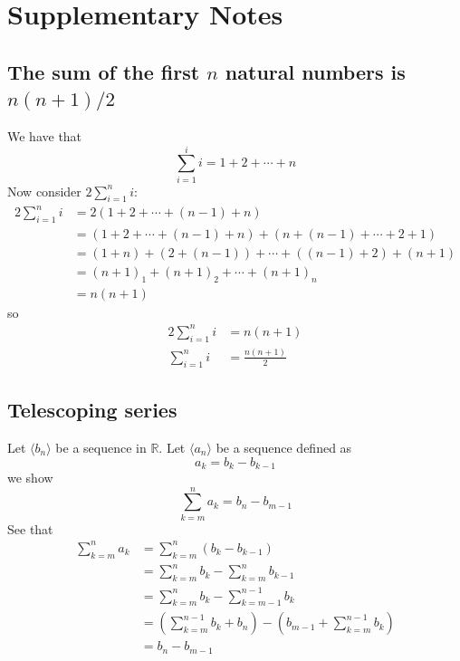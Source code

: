\documentclass{report}
\begin{document}
\subsection{}








\newpage

\chapter{Supplementary Notes}

\section{The sum of the first $n$ natural numbers is $n(n+1)/2$}
\label{supnotes:1}
We have that
\begin{equation*}
\sum^i_{i=1}i=1+2+\cdots+n
\end{equation*}
Now consider $2\sum^n_{i=1}i$:
\begin{align*}
2\sum^n_{i=1}i&=2(1+2+\cdots+(n-1)+n)\\
&=(1+2+\cdots+(n-1)+n)+(n+(n-1)+\cdots+2+1)\\
&=(1+n)+(2+(n-1))+\cdots+((n-1)+2)+(n+1)\\
&=(n+1)_1+(n+1)_2+\cdots+(n+1)_n\\
&=n(n+1)
\end{align*}
so
\begin{align*}
2\sum^n_{i=1}i&=n(n+1)\\
\sum^n_{i=1}i&=\frac{n(n+1)}{2}
\end{align*}
\newpage

\section{Telescoping series}
\label{supnotes:2}
Let $\langle b_n\rangle$ be a sequence in $\mathbb{R}$. Let $\langle a_n\rangle$ be a sequence defined as
\begin{equation*}
a_k=b_k-b_{k-1}
\end{equation*}
we show
\begin{equation*}
\boxed{\sum^n_{k=m}a_k=b_n-b_{m-1}}
\end{equation*}
See that
\begin{align*}
\sum^n_{k=m}a_k&=\sum^n_{k=m}(b_k-b_{k-1})\\
&=\sum^n_{k=m}b_k-\sum^n_{k=m}b_{k-1}\\
&=\sum^n_{k=m}b_k-\sum^{n-1}_{k=m-1}b_k\\
&=\left(\sum^{n-1}_{k=m}b_k+b_n\right)-\left(b_{m-1}+\sum^{n-1}_{k=m}b_k\right)\\
&=b_n-b_{m-1}
\end{align*}
\newpage
\end{document}
